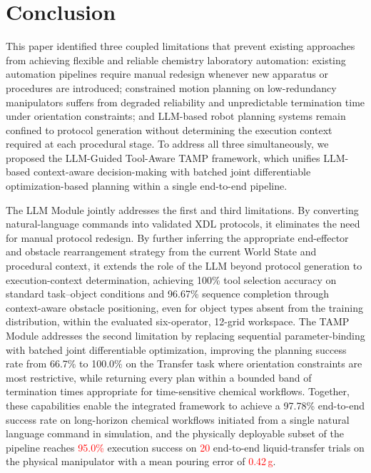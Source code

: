 \documentclass{ieeeaccess}
\newif\ifhighlight
\newcommand{\rev}[1]{\ifhighlight\hl{#1}\else#1\fi}
\newcommand{\nd}[1]{\textcolor{red}{#1}}
\begin{document}
\section{Conclusion}\label{sec:6}
This paper identified three coupled limitations that prevent existing approaches from achieving flexible and reliable chemistry laboratory automation: existing automation pipelines require manual redesign whenever new apparatus or procedures are introduced; constrained motion planning on low-redundancy manipulators suffers from degraded reliability and unpredictable termination time under orientation constraints; and LLM-based robot planning systems remain confined to protocol generation without determining the execution context required at each procedural stage. To address all three simultaneously, we proposed the LLM-Guided Tool-Aware TAMP framework, which unifies LLM-based context-aware decision-making with batched joint differentiable optimization-based planning within a single end-to-end pipeline.

The LLM Module jointly addresses the first and third limitations. By converting natural-language commands into validated XDL protocols, it eliminates the need for manual protocol redesign. By further inferring the appropriate end-effector and obstacle rearrangement strategy from the current World State and procedural context, it extends the role of the LLM beyond protocol generation to execution-context determination, achieving 100\% tool selection accuracy on standard task--object conditions and 96.67\% sequence completion through context-aware obstacle positioning, even for object types absent from the training distribution\rev{, within the evaluated six-operator, 12-grid workspace}. The TAMP Module addresses the second limitation by replacing sequential parameter-binding with batched joint differentiable optimization, improving the planning success rate from 66.7\% to 100.0\% on the Transfer task where orientation constraints are most restrictive, while \rev{returning every plan within a bounded band of termination times} appropriate for time-sensitive chemical workflows.
Together, these capabilities enable the integrated framework to achieve a 97.78\% end-to-end success rate on long-horizon chemical workflows initiated from a single natural language command \rev{in simulation, and the physically deployable subset of the pipeline reaches \nd{95.0\%} execution success on \nd{20} end-to-end liquid-transfer trials on the physical manipulator with a mean pouring error of \nd{0.42\,g}}.
\end{document}
